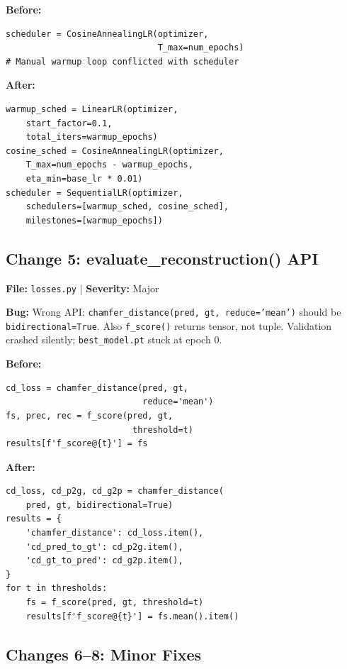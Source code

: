 \documentclass[10pt,twocolumn,letterpaper]{article}
\begin{document}
\textbf{Before:}
\begin{lstlisting}
scheduler = CosineAnnealingLR(optimizer,
                              T_max=num_epochs)
# Manual warmup loop conflicted with scheduler
\end{lstlisting}

\textbf{After:}
\begin{lstlisting}
warmup_sched = LinearLR(optimizer,
    start_factor=0.1,
    total_iters=warmup_epochs)
cosine_sched = CosineAnnealingLR(optimizer,
    T_max=num_epochs - warmup_epochs,
    eta_min=base_lr * 0.01)
scheduler = SequentialLR(optimizer,
    schedulers=[warmup_sched, cosine_sched],
    milestones=[warmup_epochs])
\end{lstlisting}

\subsection{Change 5: evaluate\_reconstruction() API}
\textbf{File:} \texttt{losses.py} | \textbf{Severity:} Major

\textbf{Bug:} Wrong API: \texttt{chamfer\_distance(pred, gt, reduce='mean')} should be \texttt{bidirectional=True}. Also \texttt{f\_score()} returns tensor, not tuple. Validation crashed silently; \texttt{best\_model.pt} stuck at epoch 0.

\textbf{Before:}
\begin{lstlisting}
cd_loss = chamfer_distance(pred, gt,
                           reduce='mean')
fs, prec, rec = f_score(pred, gt,
                         threshold=t)
results[f'f_score@{t}'] = fs
\end{lstlisting}

\textbf{After:}
\begin{lstlisting}
cd_loss, cd_p2g, cd_g2p = chamfer_distance(
    pred, gt, bidirectional=True)
results = {
    'chamfer_distance': cd_loss.item(),
    'cd_pred_to_gt': cd_p2g.item(),
    'cd_gt_to_pred': cd_g2p.item(),
}
for t in thresholds:
    fs = f_score(pred, gt, threshold=t)
    results[f'f_score@{t}'] = fs.mean().item()
\end{lstlisting}

\subsection{Changes 6--8: Minor Fixes}
\end{document}
